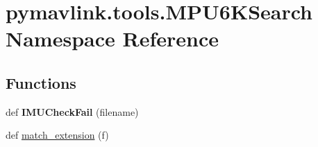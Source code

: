 \hypertarget{namespacepymavlink_1_1tools_1_1MPU6KSearch}{}\section{pymavlink.\+tools.\+M\+P\+U6\+K\+Search Namespace Reference}
\label{namespacepymavlink_1_1tools_1_1MPU6KSearch}
\subsection*{Functions}
\begin{DoxyCompactItemize}
\item 
\mbox{\label{namespacepymavlink_1_1tools_1_1MPU6KSearch_a279d987dea7583d9f989aa9cf3e8b3b7}} 
def {\bfseries I\+M\+U\+Check\+Fail} (filename)
\item 
def \hyperlink{namespacepymavlink_1_1tools_1_1MPU6KSearch_adb2e53c6e56de3bd2784aa39e2605d92}{match\+\_\+extension} (f)
\end{DoxyCompactItemize}
